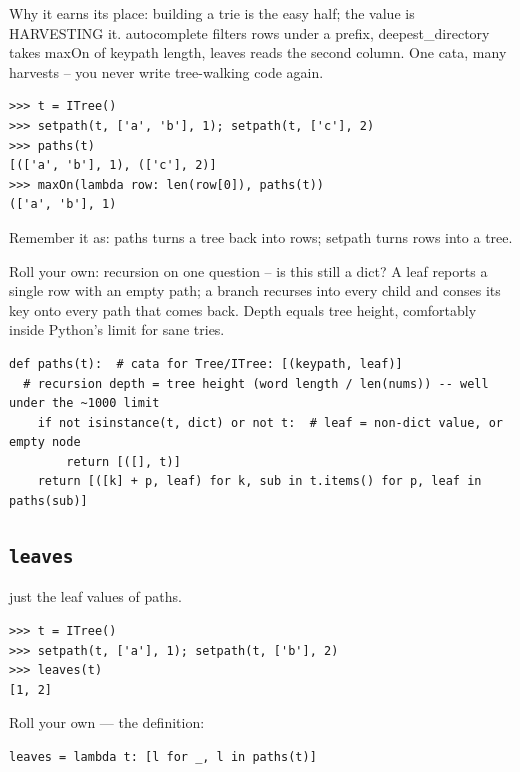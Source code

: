 \documentclass[10pt,letterpaper]{book}
\begin{document}
Why it earns its place: building a trie is the easy half; the value is HARVESTING it. autocomplete filters rows under a prefix, deepest\_directory takes maxOn of keypath length, leaves reads the second column. One cata, many harvests -- you never write tree-walking code again.

\begin{lstlisting}[style=ex]
>>> t = ITree()
>>> setpath(t, ['a', 'b'], 1); setpath(t, ['c'], 2)
>>> paths(t)
[(['a', 'b'], 1), (['c'], 2)]
>>> maxOn(lambda row: len(row[0]), paths(t))
(['a', 'b'], 1)
\end{lstlisting}

Remember it as: paths turns a tree back into rows; setpath turns rows into a tree.


Roll your own: recursion on one question -- is this still a dict? A leaf reports a single row with an empty path; a branch recurses into every child and conses its key onto every path that comes back. Depth equals tree height, comfortably inside Python's limit for sane tries.

\begin{lstlisting}[style=ex]
def paths(t):  # cata for Tree/ITree: [(keypath, leaf)]
  # recursion depth = tree height (word length / len(nums)) -- well under the ~1000 limit
    if not isinstance(t, dict) or not t:  # leaf = non-dict value, or empty node
        return [([], t)]
    return [([k] + p, leaf) for k, sub in t.items() for p, leaf in paths(sub)]
\end{lstlisting}

\subsection{\texttt{leaves}}\label{def:leaves}
just the leaf values of paths.
\begin{lstlisting}[style=ex]
>>> t = ITree()
>>> setpath(t, ['a'], 1); setpath(t, ['b'], 2)
>>> leaves(t)
[1, 2]
\end{lstlisting}

Roll your own --- the definition:

\begin{lstlisting}[style=ex]
leaves = lambda t: [l for _, l in paths(t)]
\end{lstlisting}
\end{document}
